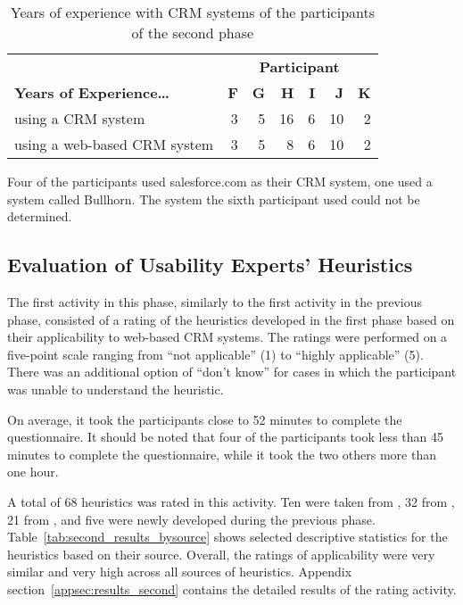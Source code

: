 \begin{table}[hbtp]
	\centering
	\vspace{0.5cm}
	\caption{Years of experience with CRM systems of the participants of the second phase}
	\begin{tabular}{lrrrrrr} \toprule
		& \multicolumn{6}{c}{\textbf{Participant}} \\
		\textbf{Years of Experience\ldots{}} & \textbf{F} & \textbf{G} & \textbf{H} & \textbf{I} & \textbf{J} & \textbf{K} \\ \midrule
		using a CRM system 				& 3 & 5 & 16 & 6 & 10 & 2 \\
		using a web-based CRM system	& 3 & 5 &  8 & 6 & 10 & 2 \\
		\bottomrule
	\end{tabular}
	\label{tab:second_participants}
\end{table}

Four of the participants used salesforce.com as their CRM system, one used a system called Bullhorn. The system the sixth participant used could not be determined.

\subsection{Evaluation of Usability Experts' Heuristics}
\label{sec:evaluation_existing_second}
The first activity in this phase, similarly to the first activity in the previous phase, consisted of a rating of the heuristics developed in the first phase based on their applicability to web-based CRM systems. The ratings were performed on a five-point scale ranging from ``not applicable'' (1) to ``highly applicable'' (5). There was an additional option of ``don't know'' for cases in which the participant was unable to understand the heuristic.

On average, it took the participants close to 52 minutes to complete the questionnaire. It should be noted that four of the participants took less than 45 minutes to complete the questionnaire, while it took the two others more than one hour.

A total of 68 heuristics was rated in this activity. Ten were taken from \citet{Nielsen1994a}, 32 from \citet{Singh2009}, 21 from \citet{Ardito2006}, and five were newly developed during the previous phase. Table~\ref{tab:second_results_bysource} shows selected descriptive statistics for the heuristics based on their source. Overall, the ratings of applicability were very similar and very high across all sources of heuristics. Appendix section~\ref{appsec:results_second} contains the detailed results of the rating activity.

